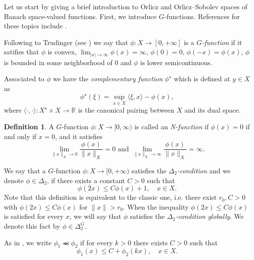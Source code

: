 \documentclass[twoside]{article}
\theoremstyle{definition}
\newtheorem{definition}{Definition}[section]
\theoremstyle{plain}
\theoremstyle{remark}
\begin{document}
Let us start by giving a brief introduction to Orlicz and Orlicz–Sobolev spaces of Banach space-valued functions. First, we introduce  $G$-functions.  References for  these topics include \cite{orliczvectorial2005,Mazzone2019,trudinger1974imbedding,acinas2019clarke,chamra2017anisotropic}.


  Following to Trudinger (see \cite{trudinger1974imbedding}) we say that  $\phi: X \to [0,+\infty]$   is a \emph{$G$-function} if it satifies that $\phi$ is convex, $\lim_{|x|\to\infty}\phi(x)=\infty$, $\phi(0)=0$, $\phi(-x)=\phi(x)$, $\phi$ is bounded in some  neighborhood of $0$ and $\phi$ is lower semicontinuous.

Associated to $\phi$ we have the \emph{complementary function} $\phi^{\star}$ which is defined at $y\in X$ as
\begin{equation}\label{eq:conjugada}
 \phi^{\star}(\xi)=\sup\limits_{x\in X} \langle \xi, x\rangle-\phi(x),
\end{equation}
where $ \langle \cdot, \cdot\rangle : X^\star\times X\to\mathbb{R}$ is the canonical pairing between $X$ and its dual space.


\begin{definition}\label{def:n-function}
A $G$-function $\phi:X \to [0, \infty)$ is called an \emph{N-function}  if $\phi(x) = 0$ if and only if $x = 0$, and it satisfies
\[
\lim_{\|x\|_X \to 0} \frac{\phi(x)}{\|x\|_X} = 0 \text{ and } \lim_{\|x\|_X \to \infty} \frac{\phi(x)}{\|x\|_X} = \infty.
\]
\end{definition}


We say that a $G$-function $\phi:X\rightarrow [0,+\infty)$ satisfies the  \emph{$\Delta_2$-condition} and we denote  $\phi \in \Delta_2$,
if there exists a  constant $C>0$  such that
\begin{equation}\label{delta2defi}\phi(2x)\leq C \phi(x)+1,\quad x\in X.
\end{equation}
Note that this definition is equivalent to the classic one, 
i.e. there exist $r_0, C > 0$  with $\phi(2x) \leq C\phi(x)$ for $\|x\| > r_0$.  When the inequality $\phi(2x)\leq C \phi(x)$ is satisfied for every $x$, we will say that $\phi$  satisfies the \emph{$\Delta_2$-condition globally}.  We denote this fact by $\phi\in \Delta_2^G$.

As in  \cite{rao1991theory}, we write $\phi_1\llcurly\phi_2$ if for every $k>0$ there exists  $C>0$ such that
\begin{equation}\label{eq:orden} \phi_1(x)\leq C+\phi_2(kx),\quad x\in X.\end{equation}
\end{document}
